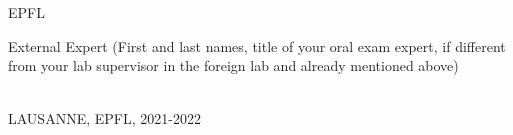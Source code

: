\begin{titlepage}
\centering EPFL \\[0.75cm] 

\parbox{\textwidth}{
\centering External Expert (First and last names, title of your oral exam expert, if different from your lab
supervisor in the foreign lab and already mentioned above)
}\\[0.75cm]


{LAUSANNE, EPFL, 2021-2022}

\vfill %

\end{titlepage}